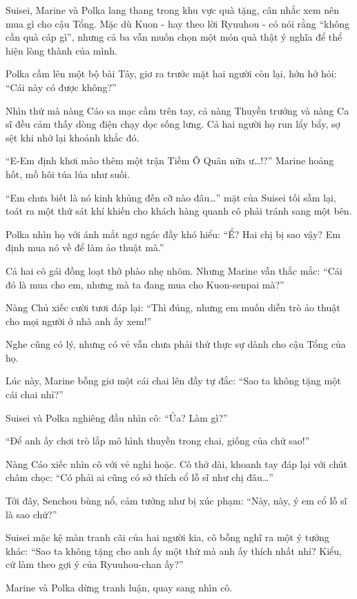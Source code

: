 \documentclass[../main.tex]{subfiles}
\begin{document}
Suisei, Marine và Polka lang thang trong khu vực quà tặng, cân nhắc xem nên mua gì cho cậu Tổng. Mặc dù Kuon - hay theo lời Ryuuhou - có nói rằng ``không cần quà cáp gì'', nhưng cả ba vẫn muốn chọn một món quà thật ý nghĩa để thể hiện lòng thành của mình.

Polka cầm lên một bộ bài Tây, giơ ra trước mặt hai người còn lại, hớn hở hỏi: ``Cái này có được không?''

Nhìn thứ mà nàng Cáo sa mạc cầm trên tay, cả nàng Thuyền trưởng và nàng Ca sĩ đều cảm thấy dòng điện chạy dọc sống lưng. Cả hai người họ run lẩy bẩy, sợ sệt khi nhớ lại khoảnh khắc đó.

``E-Em định khơi mào thêm một trận Tiềm Ô Quân nữa ư\dots!?'' Marine hoảng hốt, mồ hôi túa lúa như suối.

``Em chưa biết là nó kinh khủng đến cỡ nào đâu\dots'' mặt của Suisei tối sầm lại, toát ra một thứ sát khí khiến cho khách hàng quanh cô phải tránh sang một bên.

Polka nhìn họ với ánh mắt ngơ ngác đầy khó hiểu: ``Ể? Hai chị bị sao vậy? Em định mua nó về để làm ảo thuật mà.''

Cả hai cô gái đồng loạt thở phào nhẹ nhõm. Nhưng Marine vẫn thắc mắc: ``Cái đó là mua cho em, nhưng mà ta đang mua cho Kuon-senpai mà?''

Nàng Chủ xiếc cười tươi đáp lại: ``Thì đúng, nhưng em muốn diễn trò ảo thuật cho mọi người ở nhà anh ấy xem!''

Nghe cũng có lý, nhưng có vẻ vẫn chưa phải thứ thực sự dành cho cậu Tổng của họ.

Lúc này, Marine bỗng giơ một cái chai lên đầy tự đắc: ``Sao ta không tặng một cái chai nhỉ?''

Suisei và Polka nghiêng đầu nhìn cô: ``Ủa? Làm gì?''

``Để anh ấy chơi trò lắp mô hình thuyền trong chai, giống của chứ sao!''

Nàng Cáo xiếc nhìn cô với vẻ nghi hoặc. Cô thở dài, khoanh tay đáp lại với chút châm chọc: ``Có phải ai cũng có sở thích cổ lỗ sĩ như chị đâu\dots''

Tới đây, Senchou bùng nổ, cảm tưởng như bị xúc phạm: ``Này, này, ý em cổ lỗ sĩ là sao chứ?''

Suisei mặc kệ màn tranh cãi của hai người kia, cô bỗng nghĩ ra một ý tưởng khác: ``Sao ta không tặng cho anh ấy một thứ mà anh ấy thích nhất nhỉ? Kiểu, cứ làm theo gợi ý của Ryuuhou-chan ấy?''

Marine và Polka dừng tranh luận, quay sang nhìn cô.
\end{document}
